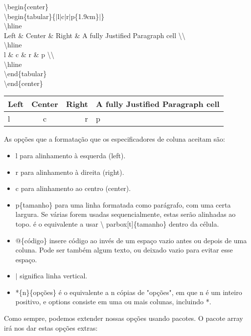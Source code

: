 \noindent\textbackslash begin\{center\}\\
\textbackslash begin\{tabular\}\{$|$l$|$c$|$r$|$p\{1.9cm\}$|$\}\\
	\textbackslash hline\\
	Left \& Center \& Right \& A fully Justified Paragraph cell \textbackslash \textbackslash \\
	\textbackslash hline\\
	l \& c \& r \& p \textbackslash \textbackslash \\
	\textbackslash hline\\
\textbackslash end\{tabular\}\\
\textbackslash end\{center\}\\

\begin{center}
\begin{tabular}{|l|c|r|p{1.9cm}|}
	\hline
	Left & Center & Right & A fully Justified Paragraph cell \\
	\hline
	l & c & r & p \\
	\hline
\end{tabular}
\end{center}

As opções que a formatação que os especificadores de coluna aceitam são:

\begin{itemize}
	\item l para alinhamento à esquerda (left).
	\item r para alinhamento à direita (right).
	\item c para alinhamento ao centro (center).
	\item p\{tamanho\} para uma linha formatada como parágrafo, com uma
		certa largura. Se várias forem usadas sequencialmente, estas
		serão alinhadas ao topo. é o equivalente a usar \textbackslash
		parbox[t]\{tamanho\} dentro da célula.  \item @\{código\}
		insere código ao invés de um espaço vazio antes ou depois de
		uma coluna. Pode ser também algum texto, ou deixado vazio para
		evitar esse espaço.
	\item $|$ significa linha vertical.
	\item *\{n\}\{opções\} é o equivalente a n cópias de "opções", em que n
		é um inteiro positivo, e options consiste em uma ou mais
		colunas, incluindo *.
\end{itemize}

Como sempre, podemos extender nossas opções usando pacotes. O pacote array irá
nos dar estas opções extras:

